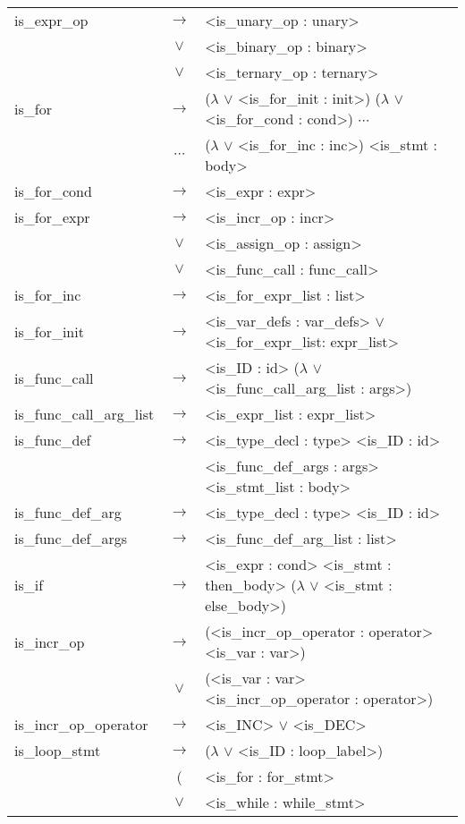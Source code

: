 \documentclass[a4paper]{article}
\begin{document}
\begin{longtable}{lcl}
	is\_expr\_op				& $\to$ & <is\_unary\_op : unary> \\
								& $\vee$ & <is\_binary\_op : binary>\\
								& $\vee$ & <is\_ternary\_op : ternary>\\
	is\_for						& $\to$ & ($\lambda$ $\vee$ <is\_for\_init : init>) ($\lambda$ $\vee$ <is\_for\_cond : cond>) $\cdots$ \\
								& $\cdots$ & ($\lambda$ $\vee$ <is\_for\_inc : inc>) <is\_stmt : body> \\
	is\_for\_cond				& $\to$ & <is\_expr : expr> \\	
	is\_for\_expr				& $\to$ & <is\_incr\_op : incr> \\
								& $\vee$ & <is\_assign\_op : assign> \\
								& $\vee$ & <is\_func\_call : func\_call> \\
	is\_for\_inc				& $\to$ & <is\_for\_expr\_list : list> \\ 	
	is\_for\_init				& $\to$ & <is\_var\_defs : var\_defs> $\vee$ <is\_for\_expr\_list: expr\_list> \\
	is\_func\_call				& $\to$ & <is\_ID : id> ($\lambda$ $\vee$ <is\_func\_call\_arg\_list : args>) \\
	is\_func\_call\_arg\_list	& $\to$ & <is\_expr\_list : expr\_list> \\	
	is\_func\_def				& $\to$ & <is\_type\_decl : type> <is\_ID : id> \\
								&       & <is\_func\_def\_args : args> <is\_stmt\_list : body> \\
	is\_func\_def\_arg			& $\to$ & <is\_type\_decl : type> <is\_ID : id> \\
	is\_func\_def\_args			& $\to$ & <is\_func\_def\_arg\_list : list> \\		
	is\_if						& $\to$ & <is\_expr : cond> <is\_stmt : then\_body> ($\lambda$ $\vee$ <is\_stmt : else\_body>) \\
	is\_incr\_op				& $\to$ &(<is\_incr\_op\_operator : operator> <is\_var : var>) \\
								& $\vee$ & (<is\_var : var> <is\_incr\_op\_operator : operator>) \\
	is\_incr\_op\_operator		& $\to$ & <is\_INC> $\vee$ <is\_DEC> \\
	is\_loop\_stmt				& $\to$ & ($\lambda$ $\vee$ <is\_ID : loop\_label>)\\
								& ( & <is\_for : for\_stmt> \\
								& $\vee$ & <is\_while : while\_stmt> \\ 

\end{longtable}
\end{document}
